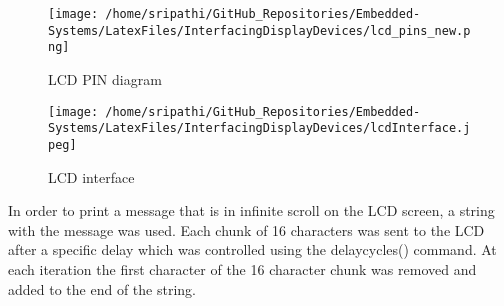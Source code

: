 \documentclass[12pt, letterpaper]{article}
\begin{document}
\begin{figure}[!h]
	\centering
	\texttt{[image: /home/sripathi/GitHub\_Repositories/Embedded-Systems/LatexFiles/InterfacingDisplayDevices/lcd\_pins\_new.png]}
	\caption{LCD PIN diagram}
	\label{fig:lcdPinout}
\end{figure} 

\begin{figure}[!h]
	\centering
	\texttt{[image: /home/sripathi/GitHub\_Repositories/Embedded-Systems/LatexFiles/InterfacingDisplayDevices/lcdInterface.jpeg]}
	\caption{LCD interface}
	\label{fig:lcdInterface}
\end{figure} 

In order to print a message that is in infinite scroll on the LCD screen, a string with the message was used. Each chunk of 16 characters was sent to the LCD after a specific delay which was controlled using the delaycycles() command. At each iteration the first character of the 16 character chunk was removed and added to the end of the string. 
\end{document}
